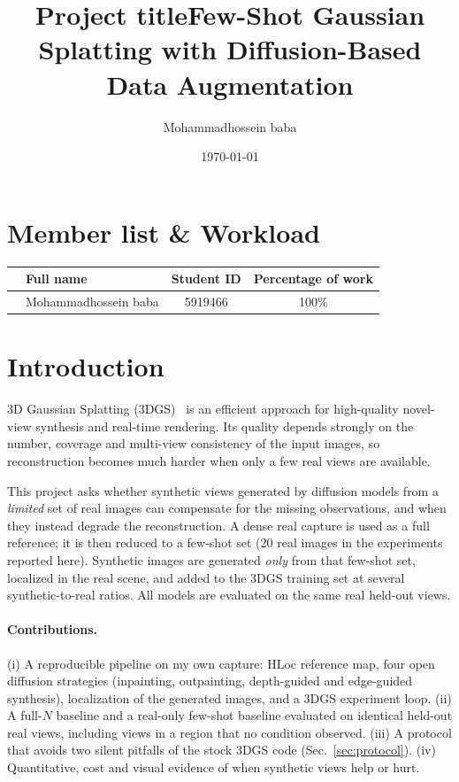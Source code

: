 \documentclass{article}
\title{Project title}
\title{Few-Shot Gaussian Splatting with
Diffusion-Based Data Augmentation}
\author{Mohammadhossein baba}
\date{\today}
\newcounter{memberrowno}
\begin{document}
\coverpage%

\section*{Member list \& Workload}
\begin{center}
  \begin{tabular}{>{\stepcounter{memberrowno}\thememberrowno}llcc}
    \toprule
    \multicolumn{1}{c}{\textbf{No.}} & \textbf{Full name} & \textbf{Student ID} & \textbf{Percentage of work} \\
    \midrule
                                     & Mohammadhossein baba                  & 5919466             & 100\%                       \\
    \bottomrule
  \end{tabular}
\end{center}

\newpage
\tableofcontents
\newpage


\section{Introduction}

3D Gaussian Splatting (3DGS)~\cite{kerbl2023gs} is an efficient approach for high-quality novel-view synthesis and
real-time rendering. Its quality depends strongly on the number, coverage and multi-view consistency of the
input images, so reconstruction becomes much harder when only a few real views are available.

This project asks whether synthetic views generated by diffusion models from a \emph{limited} set of real images can
compensate for the missing observations, and when they instead degrade the reconstruction. A dense real capture is
used as a full reference; it is then reduced to a few-shot set (20 real images in the experiments reported here). Synthetic images are
generated \emph{only} from that few-shot set, localized in the real scene, and added to the 3DGS training set at
several synthetic-to-real ratios. All models are evaluated on the same real held-out views.

\paragraph{Contributions.}
(i) A reproducible pipeline on my own capture: HLoc reference map, four open diffusion strategies
(inpainting, outpainting, depth-guided and edge-guided synthesis), localization of the generated images, and a 3DGS
experiment loop. (ii) A full-$N$ baseline and a real-only few-shot baseline evaluated on identical held-out real views,
including views in a region that no condition observed. (iii) A protocol that avoids two silent pitfalls of the stock
3DGS code (Sec.~\ref{sec:protocol}). (iv) Quantitative, cost and visual evidence of when synthetic views help or hurt.
\end{document}
